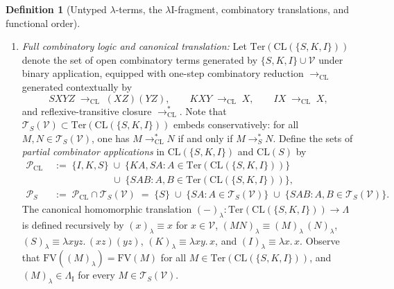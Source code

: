 \documentclass[11pt,reqno]{amsart}
\numberwithin{equation}{section}
\theoremstyle{plain}
\theoremstyle{definition}
\newtheorem{definition}[theorem]{Definition}
\theoremstyle{remark}
\newcommand{\CLS}{\mathrm{CL}(S)}
\newcommand{\TSV}{\mathcal{T}_S(\mathcal{V})}
\newcommand{\redSs}{\to_S^*}
\begin{document}
\begin{definition}[Untyped $\lambda$-terms, the $\lambda\mathrm{I}$-fragment, combinatory translations, and functional order]
\begin{enumerate}[label=(\roman*),leftmargin=2.2em]
  \item \emph{Full combinatory logic and canonical translation:} Let $\mathrm{Ter}(\mathrm{CL}(\{S, K, I\}))$ denote the set of open combinatory terms generated by $\{S, K, I\} \cup \mathcal{V}$ under binary application, equipped with one-step combinatory reduction $\to_{\mathrm{CL}}$ generated contextually by
  \begin{equation}\label{eq:cl-ski-rules}
    S X Y Z \;\to_{\mathrm{CL}}\; (X Z)(Y Z), \qquad K X Y \;\to_{\mathrm{CL}}\; X, \qquad I X \;\to_{\mathrm{CL}}\; X,
  \end{equation}
  and reflexive-transitive closure $\to_{\mathrm{CL}}^*$. Note that $\TSV \subset \mathrm{Ter}(\mathrm{CL}(\{S, K, I\}))$ embeds conservatively: for all $M, N \in \TSV$, one has $M \to_{\mathrm{CL}}^* N$ if and only if $M \redSs N$. Define the sets of \emph{partial combinator applications} in $\mathrm{CL}(\{S, K, I\})$ and $\CLS$ by
  \begin{equation}\label{eq:partial-comb-sets}
  \begin{aligned}
    \mathcal{P}_{\mathrm{CL}} &\;:=\; \{I, K, S\} \;\cup\; \{K A, S A : A \in \mathrm{Ter}(\mathrm{CL}(\{S, K, I\}))\} \\
    &\qquad\qquad\qquad \;\cup\; \{S A B : A, B \in \mathrm{Ter}(\mathrm{CL}(\{S, K, I\}))\}, \\
    \mathcal{P}_S &\;:=\; \mathcal{P}_{\mathrm{CL}} \cap \TSV \;=\; \{S\} \;\cup\; \{S A : A \in \TSV\} \;\cup\; \{S A B : A, B \in \TSV\}.
  \end{aligned}
  \end{equation}
  The canonical homomorphic translation $(-)_\lambda \colon \mathrm{Ter}(\mathrm{CL}(\{S, K, I\})) \to \Lambda$ is defined recursively by $(x)_\lambda \equiv x$ for $x \in \mathcal{V}$, $(M N)_\lambda \equiv (M)_\lambda\,(N)_\lambda$, $(S)_\lambda \equiv \lambda x y z.\, (x z)(y z)$, $(K)_\lambda \equiv \lambda x y.\, x$, and $(I)_\lambda \equiv \lambda x.\, x$. Observe that $\mathrm{FV}((M)_\lambda) = \mathrm{FV}(M)$ for all $M \in \mathrm{Ter}(\mathrm{CL}(\{S, K, I\}))$, and $(M)_\lambda \in \Lambda_{\mathrm{I}}$ for every $M \in \TSV$.

\end{enumerate}
\end{definition}
\end{document}
